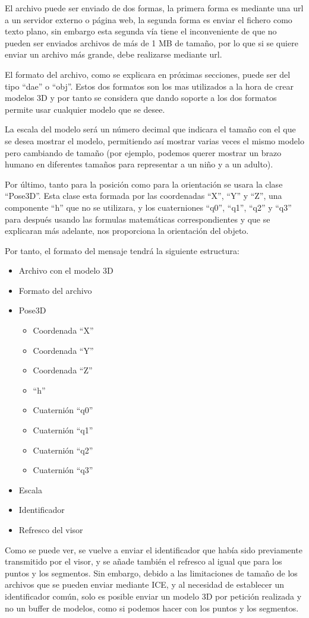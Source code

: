 El archivo puede ser enviado de dos formas, la primera forma es mediante una url a un servidor externo o página web, la segunda forma es enviar el fichero como texto plano, sin embargo esta segunda vía tiene el inconveniente de que no pueden ser enviados archivos de más de 1 MB de tamaño, por lo que si se quiere enviar un archivo más grande, debe realizarse mediante url.

El formato del archivo, como se explicara en próximas secciones, puede ser del tipo ``dae'' o ``obj''. Estos dos formatos son los mas utilizados a la hora de crear modelos 3D y por tanto se considera que dando soporte a los dos formatos permite usar cualquier modelo que se desee.

La escala del modelo será un número decimal que indicara el tamaño con el que se desea mostrar el modelo, permitiendo así mostrar varias veces el mismo modelo pero cambiando de tamaño (por ejemplo, podemos querer mostrar un brazo humano en diferentes tamaños para representar a un niño y a un adulto).

Por último, tanto para la posición como para la orientación se usara la clase ``Pose3D''. Esta clase esta formada por las coordenadas ``X'', ``Y'' y ``Z'', una componente ``h'' que no se utilizara, y los cuaterniones ``q0'', ``q1'', ``q2'' y ``q3'' para después usando las formulas matemáticas correspondientes y que se explicaran más adelante, nos proporciona la orientación del objeto.

Por tanto, el formato del mensaje tendrá la siguiente estructura:
\begin{itemize}
	\item Archivo con el modelo 3D
	\item Formato del archivo
	\item	Pose3D
	\begin{itemize}
		\item Coordenada ``X''
		\item Coordenada ``Y''
		\item Coordenada ``Z''
		\item ``h''
		\item Cuaternión ``q0''
		\item Cuaternión ``q1''
		\item Cuaternión ``q2''
		\item Cuaternión ``q3''
	\end{itemize}
	\item Escala
	\item Identificador
	\item Refresco del visor
\end{itemize}
Como se puede ver, se vuelve a enviar el identificador que había sido previamente transmitido por el visor, y se añade también el refresco al igual que para los puntos y los segmentos. Sin embargo, debido a las limitaciones de tamaño de los archivos que se pueden enviar mediante ICE, y al necesidad de establecer un identificador común, solo es posible enviar un modelo 3D por petición realizada y no un buffer de modelos, como si podemos hacer con los puntos y los segmentos.

